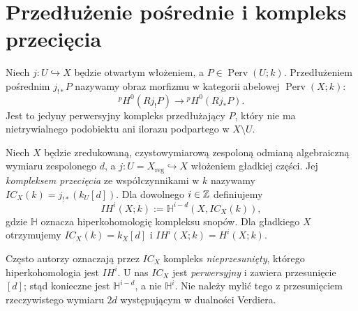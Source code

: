 \section{Przedłużenie pośrednie i kompleks przecięcia}
\begin{definicja}
\label{def:middle-extension-xiii}
Niech $j:U\hookrightarrow X$ będzie otwartym włożeniem,
a $P\in\operatorname{Perv}(U;k)$.
Przedłużeniem pośrednim $j_{!*}P$ nazywamy obraz
morfizmu w kategorii abelowej $\operatorname{Perv}(X;k)$:
\[
{}^p\!H^0(Rj_!P)\longrightarrow {}^p\!H^0(Rj_*P).
\]
Jest to jedyny perwersyjny kompleks przedłużający $P$,
który nie ma nietrywialnego podobiektu ani ilorazu
podpartego w $X\setminus U$.
\end{definicja}
\begin{definicja}
\label{def:ic-xiii}
Niech $X$ będzie zredukowaną, czystowymiarową zespoloną
odmianą algebraiczną wymiaru zespolonego $d$, a
$j:U=X_{\mathrm{reg}}\hookrightarrow X$ włożeniem
gładkiej części. Jej \emph{kompleksem przecięcia}
ze współczynnikami w $k$ nazywamy
$IC_X(k)=j_{!*}(k_U[d])$.
Dla dowolnego $i\in\mathbb{Z}$ definiujemy
\[
IH^i(X;k):=\mathbb H^{i-d}(X,IC_X(k)),
\]
gdzie $\mathbb H$ oznacza hiperkohomologię kompleksu snopów.
Dla gładkiego $X$ otrzymujemy $IC_X(k)=k_X[d]$
i $IH^i(X;k)=H^i(X;k)$.
\end{definicja}
\begin{uwaga}
Często autorzy oznaczają przez $IC_X$ kompleks
\emph{nieprzesunięty}, którego hiperkohomologia
jest $IH^i$. U nas $IC_X$ jest \emph{perwersyjny}
i zawiera przesunięcie $[d]$; stąd konieczne jest
$\mathbb H^{i-d}$, a nie $\mathbb H^i$.
Nie należy mylić tego z przesunięciem rzeczywistego
wymiaru $2d$ występującym w dualności Verdiera.
\end{uwaga}

